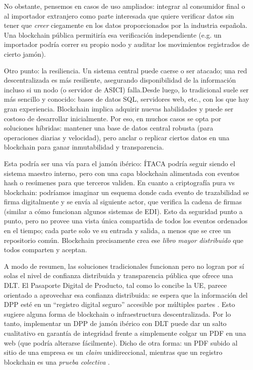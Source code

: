 No obstante, pensemos en casos de uso ampliados: integrar al consumidor final o al importador extranjero como parte interesada que quiere verificar datos sin tener que \textit{creer} ciegamente en los datos proporcionados por la industria española. Una blockchain pública permitiría esa verificación independiente (e.g. un importador podría correr su propio nodo y auditar los movimientos registrados de cierto jamón).

Otro punto: la resiliencia. Un sistema central puede caerse o ser atacado; una red descentralizada es más resiliente, asegurando disponibilidad de la información incluso si un nodo (o servidor de ASICI) falla.Desde luego, lo tradicional suele ser más sencillo y conocido: bases de datos SQL, servidores web, etc., con los que hay gran experiencia. Blockchain implica adquirir nuevas habilidades y puede ser costoso de desarrollar inicialmente. Por eso, en muchos casos se opta por soluciones híbridas: mantener una base de datos central robusta (para operaciones diarias y velocidad), pero anclar o replicar ciertos datos en una blockchain para ganar inmutabilidad y transparencia.

Esta podría ser una vía para el jamón ibérico: ÍTACA podría seguir siendo el sistema maestro interno, pero con una capa blockchain alimentada con eventos hash o resúmenes para que terceros validen. En cuanto a criptografía pura vs blockchain: podríamos imaginar un esquema donde cada evento de trazabilidad se firma digitalmente y se envía al siguiente actor, que verifica la cadena de firmas (similar a cómo funcionan algunos sistemas de EDI). Esto da seguridad punto a punto, pero no provee una vista única compartida de todos los eventos ordenados en el tiempo; cada parte solo ve su entrada y salida, a menos que se cree un repositorio común. Blockchain precisamente crea ese \textit{libro mayor distribuido} que todos comparten y aceptan.

A modo de resumen, las soluciones tradicionales funcionan pero no logran por sí solas el nivel de confianza distribuida y transparencia pública que ofrece una DLT. El Pasaporte Digital de Producto, tal como lo concibe la UE, parece orientado a aprovechar esa confianza distribuida: se espera que la información del DPP esté en un “registro digital seguro” accesible por múltiples partes \cite{motusic_understanding_2024}. Esto sugiere alguna forma de blockchain o infraestructura descentralizada. Por lo tanto, implementar un DPP de jamón ibérico con DLT puede dar un salto cualitativo en garantía de integridad frente a simplemente colgar un PDF en una web (que podría alterarse fácilmente). Dicho de otra forma: un PDF subido al sitio de una empresa es un \textit{claim} unidireccional, mientras que un registro blockchain es una \textit{prueba colectiva} \cite{motusic_understanding_2024}.